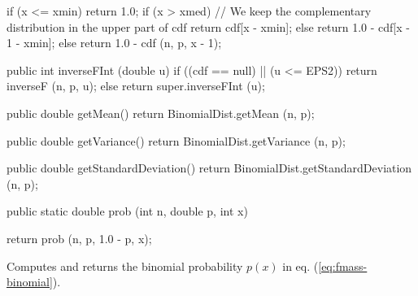 \begin{code}
\begin{hide}
{{         if (x <= xmin)
            return 1.0;
         if (x > xmed)
            // We keep the complementary distribution in the upper part of cdf
            return cdf[x - xmin];
         else
            return 1.0 - cdf[x - 1 - xmin];
      } else
         return 1.0 - cdf (n, p, x - 1);
   }


   public int inverseFInt (double u) {
      if ((cdf == null) || (u <= EPS2))
         return inverseF (n, p, u);
      else
         return super.inverseFInt (u);
   }

   public double getMean() {
      return BinomialDist.getMean (n, p);
   }

   public double getVariance() {
      return BinomialDist.getVariance (n, p);
   }

   public double getStandardDeviation() {
      return BinomialDist.getStandardDeviation (n, p);
   }

\end{hide}

   public static double prob (int n, double p, int x)\begin{hide} {
      return prob (n, p, 1.0 - p, x);
   }\end{hide}
\end{code}
\begin{tabb}  Computes and returns the binomial probability $p(x)$ in eq.
(\ref{eq:fmass-binomial}).
\end{tabb}
